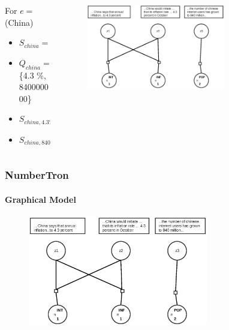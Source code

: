 \documentclass{beamer}
\begin{document}
\begin{frame}
\begin{columns}[T] %
\begin{column}{.30\textwidth}
For  $e =$ (China)
\begin{itemize}
\setlength \itemsep{1em}
\item $S_{china} = \{(i), (ii), (iii)\}$  
\item $Q_{china} = $ \{4.3 \%, 840000000\}
\item $S_{china, 4.3 \%} = \{(i), (ii)\}$ 
\item $S_{china, 840000000} = \{(iii)\}$ 
\end{itemize}
\end{column}%

\hfill%

\begin{column}{.68\textwidth}
\begin{figure}
\includegraphics[width=0.7\textwidth]{images/numbertronmodel.eps}
\end{figure}
\end{column}%
\end{columns}
\end{frame}


\begin{frame}
 \frametitle{NumberTron}
\framesubtitle{Graphical Model}
\begin{figure}
\includegraphics[width=0.7\textwidth]{images/numbertronmodel.eps}
\end{figure}

\end{frame}
\end{document}
